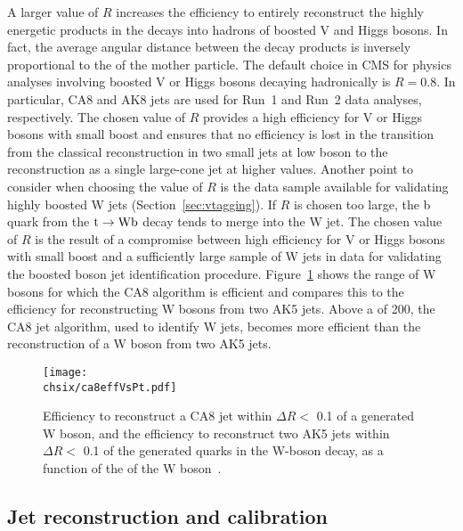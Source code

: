 A larger value of $R$ increases the efficiency to entirely reconstruct the highly energetic products in the decays into hadrons of boosted V and Higgs bosons.
In fact, the average angular distance between the decay products is inversely proportional to the \pt of the mother particle. The default choice in CMS for physics analyses involving boosted V or Higgs bosons decaying hadronically is $R = 0.8$. In particular, CA8 and AK8 jets are used for Run~1 and Run~2 data analyses, respectively. The chosen value of $R$ provides a high efficiency for V or Higgs bosons with small boost and ensures that no efficiency is lost in the transition from the classical reconstruction in two small jets at low boson \pt to the reconstruction as a single large-cone jet at higher values. Another point to consider when choosing the value of $R$ is the \ttbar data sample available for validating highly boosted W jets (Section~\ref{sec:vtagging}). If $R$ is chosen too large, the b quark from the $\mathrm{t}\to\mathrm{W}\mathrm{b}$ decay tends to merge into the W jet. The chosen value of $R$ is the result of a compromise between high efficiency for V or Higgs bosons with small boost and a sufficiently large sample of W jets in \ttbar data for validating the boosted boson jet identification procedure. Figure~\ref{fig:ca8effVsPt} shows the \pt range of W bosons for which the CA8 algorithm is efficient and compares this to the efficiency for reconstructing W bosons from two AK5 jets. Above a \pt of 200\GeV, the CA8 jet algorithm, used to identify W jets, becomes more efficient than the reconstruction of a W boson from two AK5 jets.

\begin{figure}[!htb]
 \begin{center}
  \texttt{[image: \\chsix/ca8effVsPt.pdf]}
 \end{center}
 \caption{Efficiency to reconstruct a CA8 jet within $\Delta R <$ 0.1 of a generated W boson, and the efficiency to reconstruct two AK5 jets within $\Delta R <$ 0.1 of the generated quarks in the W-boson decay, as a function of the \pt of the W boson~\cite{Khachatryan:2014vla}.}
 \label{fig:ca8effVsPt}
\end{figure}

\subsection{Jet reconstruction and calibration}\label{subsec:jetsreco} %

